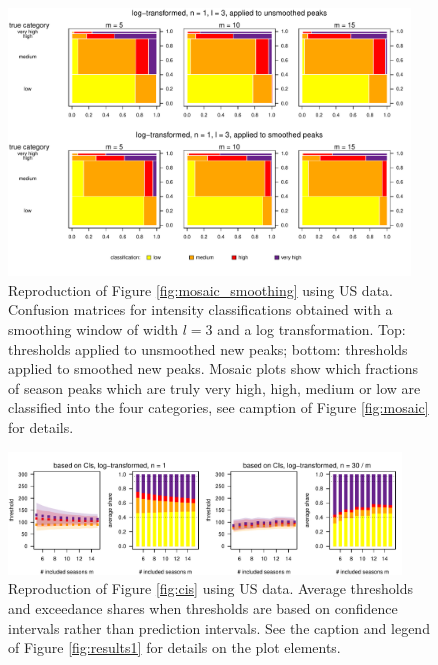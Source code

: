 \documentclass{article}
\begin{document}
\begin{figure}
\includegraphics[width=0.95\textwidth]{figure/mosaic_log_smoothed_us.pdf}
\caption{Reproduction of Figure \ref{fig:mosaic_smoothing} using US data. Confusion matrices for intensity classifications obtained with a smoothing window of width $l = 3$ and a log transformation. Top: thresholds applied to unsmoothed new peaks; bottom: thresholds applied to smoothed new peaks. Mosaic plots show which fractions of season peaks which are truly very high, high, medium or low are classified into the four categories, see camption of Figure \ref{fig:mosaic} for details.}
\label{fig:mosaic_smoothing_us}
\end{figure}


\begin{figure}
\includegraphics[width=0.93\textwidth]{figure/plot_ci_us.pdf}
\caption{Reproduction of Figure \ref{fig:cis} using US data. Average thresholds and exceedance shares when thresholds are based on confidence intervals rather than prediction intervals. See the caption and legend of Figure \ref{fig:results1} for details on the plot elements.}
\label{fig:cis_us}
\end{figure}
\end{document}
